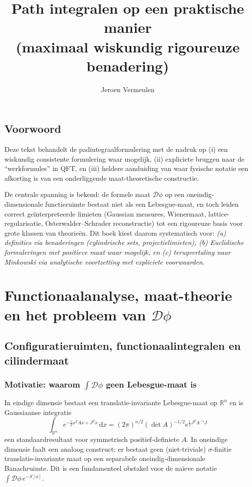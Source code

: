 \documentclass[11pt,a4paper,oneside]{book}
\title{Path integralen op een praktische manier\\
	\large (maximaal wiskundig rigoureuze benadering)}
\author{Jeroen Vermeulen}
\date{}
\theoremstyle{plain}
\theoremstyle{definition}
\newcommand{\R}{\mathbb{R}}
\renewcommand{\dd}{\,\mathrm{d}}
\newcommand{\cD}{\mathcal{D}}
\begin{document}
	
	\frontmatter
	\maketitle
	\tableofcontents
	
	\chapter*{Voorwoord}
	
	Deze tekst behandelt de padintegraalformulering met de nadruk op (i) een wiskundig consistente formulering waar mogelijk,
	(ii) expliciete bruggen naar de ``werkformules'' in QFT, en (iii) heldere aanduiding van waar fysische notatie een
	afkorting is van een onderliggende maat-theoretische constructie.
	
	De centrale spanning is bekend: de formele maat $\cD\phi$ op een oneindig-dimensionale functieruimte bestaat niet als
	een Lebesgue-maat, en toch leiden correct geïnterpreteerde limieten (Gaussian measures, Wienermaat, lattice-regularisatie,
	Osterwalder--Schrader reconstructie) tot een rigoureuze basis voor grote klassen van theorieën. Dit boek kiest daarom
	systematisch voor: \emph{(a) definities via benaderingen (cylindrische sets, projectielimieten), (b) Euclidische formuleringen
		met positieve maat waar mogelijk, en (c) terugvertaling naar Minkowski via analytische voortzetting met expliciete voorwaarden.}
	
	\mainmatter
	
	\part{Functionaalanalyse, maat-theorie en het probleem van $\cD\phi$}
	
	\chapter{Configuratieruimten, functionaalintegralen en cilindermaat}
	
	\section{Motivatie: waarom $\int \cD\phi$ geen Lebesgue-maat is}
	In eindige dimensie bestaat een translatie-invariante Lebesgue-maat op $\R^n$ en is Gaussiaanse integratie
	\[
	\int_{\R^n} e^{-\frac12 x^T A x + J^T x}\dd x
	= (2\pi)^{n/2}(\det A)^{-1/2}e^{\frac12 J^T A^{-1}J}
	\]
	een standaardresultaat voor symmetrisch positief-definiete $A$.
	In oneindige dimensie faalt een analoog construct: er bestaat geen (niet-triviale) $\sigma$-finitie translatie-invariante maat
	op een separabele oneindig-dimensionale Banachruimte. Dit is een fundamenteel obstakel voor de naïeve notatie
	$\int \cD\phi\, e^{-S[\phi]}$.
	
\end{document}
